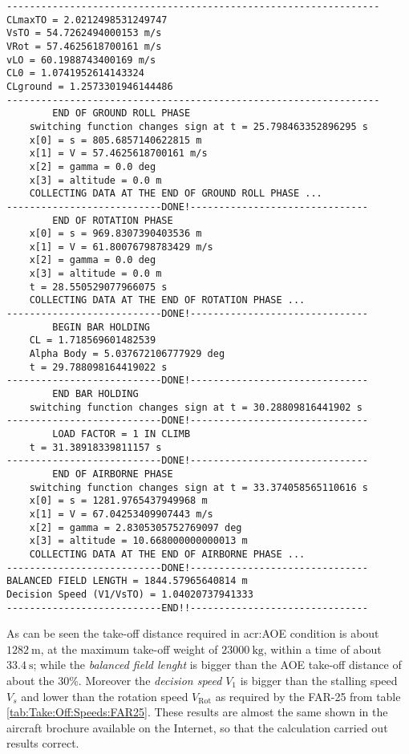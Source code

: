 \bigskip
\begin{lstlisting}[caption={ATR-72 test results}, captionpos=b, tabsize=2]
-----------------------------------------------------------------
CLmaxTO = 2.0212498531249747
VsTO = 54.7262494000153 m/s
VRot = 57.4625618700161 m/s
vLO = 60.1988743400169 m/s
CL0 = 1.0741952614143324
CLground = 1.2573301946144486
-----------------------------------------------------------------
		END OF GROUND ROLL PHASE
	switching function changes sign at t = 25.798463352896295 s
	x[0] = s = 805.6857140622815 m
	x[1] = V = 57.4625618700161 m/s
	x[2] = gamma = 0.0 deg
	x[3] = altitude = 0.0 m
	COLLECTING DATA AT THE END OF GROUND ROLL PHASE ...
---------------------------DONE!-------------------------------
		END OF ROTATION PHASE
	x[0] = s = 969.8307390403536 m
	x[1] = V = 61.80076798783429 m/s
	x[2] = gamma = 0.0 deg
	x[3] = altitude = 0.0 m
	t = 28.550529077966075 s
	COLLECTING DATA AT THE END OF ROTATION PHASE ...
---------------------------DONE!-------------------------------
		BEGIN BAR HOLDING
	CL = 1.718569601482539
	Alpha Body = 5.037672106777929 deg
	t = 29.788098164419022 s
---------------------------DONE!-------------------------------
		END BAR HOLDING
	switching function changes sign at t = 30.28809816441902 s 
---------------------------DONE!-------------------------------
		LOAD FACTOR = 1 IN CLIMB
	t = 31.38918339811157 s
---------------------------DONE!-------------------------------
		END OF AIRBORNE PHASE
	switching function changes sign at t = 33.374058565110616 s
	x[0] = s = 1281.9765437949968 m
	x[1] = V = 67.04253409907443 m/s
	x[2] = gamma = 2.8305305752769097 deg
	x[3] = altitude = 10.668000000000013 m
	COLLECTING DATA AT THE END OF AIRBORNE PHASE ...
---------------------------DONE!-------------------------------
BALANCED FIELD LENGTH = 1844.57965640814 m
Decision Speed (V1/VsTO) = 1.04020737941333 
---------------------------END!!-------------------------------
\end{lstlisting}
%
As can be seen the take-off distance required in \gls{acr:AOE} condition is about $\SI{1282}{\meter}$, at the maximum take-off weight of $\SI{23000}{\kilogram}$, within a time of about $\SI{33.4}{\second}$; while the \emph{balanced field lenght} is bigger than the AOE take-off distance of about the 30\%.  Moreover the \emph{decision speed} $V_1$ is bigger than the stalling speed $V_s$ and lower than the rotation speed $V_{\text{Rot}}$ as required by the \gls{FAR}-25 from table \ref{tab:Take:Off:Speeds:FAR25}.
%
These results are almost the same shown in the aircraft brochure available on the Internet, so that the calculation carried out results correct.
